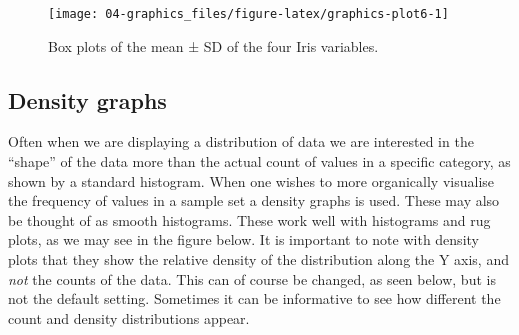 \documentclass[english,10pt,a4paper,oneside]{book}
\theoremstyle{definition}
\theoremstyle{definition}
\theoremstyle{definition}
\theoremstyle{remark}
\begin{document}
\begin{figure}
\texttt{[image: 04-graphics\_files/figure-latex/graphics-plot6-1]} \caption{Box plots of the mean ± SD of the four Iris variables.}\label{fig:graphics-plot6}
\end{figure}

\subsection{Density graphs}\label{density-graphs}

Often when we are displaying a distribution of data we are interested in
the \enquote{shape} of the data more than the actual count of values in
a specific category, as shown by a standard histogram. When one wishes
to more organically visualise the frequency of values in a sample set a
density graphs is used. These may also be thought of as smooth
histograms. These work well with histograms and rug plots, as we may see
in the figure below. It is important to note with density plots that
they show the relative density of the distribution along the Y axis, and
\emph{not} the counts of the data. This can of course be changed, as
seen below, but is not the default setting. Sometimes it can be
informative to see how different the count and density distributions
appear.
\end{document}
